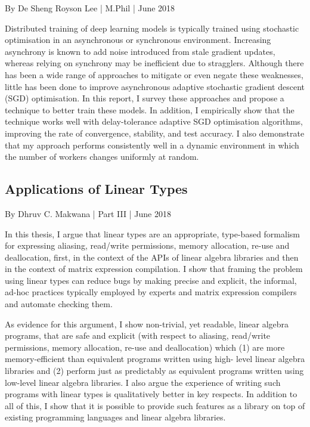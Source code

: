 By De Sheng Royson Lee | M.Phil | June 2018

Distributed training of deep learning models is typically trained using stochastic optimisation in an asynchronous or synchronous environment. Increasing asynchrony is known to add noise introduced from stale gradient updates, whereas relying on synchrony may be inefficient due to stragglers. Although there has been a wide range of approaches to mitigate or even negate these weaknesses, little has been done to improve asynchronous adaptive stochastic gradient descent (SGD) optimisation. In this report, I survey these approaches and propose a technique to better train these models. In addition, I empirically show that the technique works well with delay-tolerance adaptive SGD optimisation algorithms, improving the rate of convergence, stability, and test accuracy. I also demonstrate that my approach performs consistently well in a dynamic environment in which the number of workers changes uniformly at random.


\hypertarget{Applications of Linear Types}{%
\subsection{Applications of Linear Types}\label{theses-linear}}

By Dhruv C. Makwana | Part III | June 2018

In this thesis, I argue that linear types are an appropriate, type-based formalism for expressing aliasing, read/write permissions, memory allocation, re-use and deallocation, first, in the context of the APIs of linear algebra libraries and then in the context of matrix expression compilation. I show that framing the problem using linear types can reduce bugs by making precise and explicit, the informal, ad-hoc practices typically employed by experts and matrix expression compilers and automate checking them.

As evidence for this argument, I show non-trivial, yet readable, linear algebra programs, that are safe and explicit (with respect to aliasing, read/write permissions, memory allocation, re-use and deallocation) which (1) are more memory-efficient than equivalent programs written using high- level linear algebra libraries and (2) perform just as predictably as equivalent programs written using low-level linear algebra libraries. I also argue the experience of writing such programs with linear types is qualitatively better in key respects. In addition to all of this, I show that it is possible to provide such features as a library on top of existing programming languages and linear algebra libraries.


